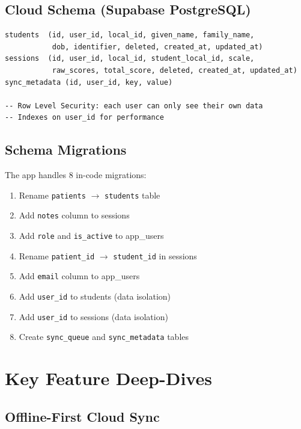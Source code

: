 \documentclass[12pt,a4paper]{article}
\begin{document}
\subsection{Cloud Schema (Supabase PostgreSQL)}

\begin{lstlisting}[style=sql, caption={Supabase cloud schema}]
students  (id, user_id, local_id, given_name, family_name,
           dob, identifier, deleted, created_at, updated_at)
sessions  (id, user_id, local_id, student_local_id, scale,
           raw_scores, total_score, deleted, created_at, updated_at)
sync_metadata (id, user_id, key, value)

-- Row Level Security: each user can only see their own data
-- Indexes on user_id for performance
\end{lstlisting}

\subsection{Schema Migrations}

The app handles 8 in-code migrations:

\begin{enumerate}
    \item Rename \texttt{patients} $\rightarrow$ \texttt{students} table
    \item Add \texttt{notes} column to sessions
    \item Add \texttt{role} and \texttt{is\_active} to app\_users
    \item Rename \texttt{patient\_id} $\rightarrow$ \texttt{student\_id} in sessions
    \item Add \texttt{email} column to app\_users
    \item Add \texttt{user\_id} to students (data isolation)
    \item Add \texttt{user\_id} to sessions (data isolation)
    \item Create \texttt{sync\_queue} and \texttt{sync\_metadata} tables
\end{enumerate}

\section{Key Feature Deep-Dives}

\subsection{Offline-First Cloud Sync}
\end{document}
